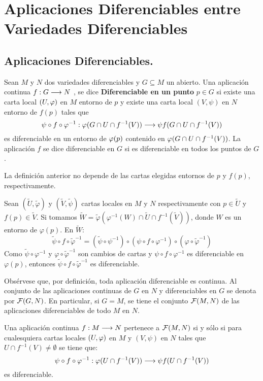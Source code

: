 \documentclass[cursovd_portada.tex]{subfiles}
\begin{document}
\chapter{Aplicaciones Diferenciables entre Variedades Diferenciables}
\section{Aplicaciones Diferenciables.}
\begin{defi}
Sean $M$ y $N$ dos variedades diferenciables y $G\subseteq M$ un abierto. Una aplicación continua $f:G\longrightarrow N$ , se
dice {\bf Diferenciable en un punto} $p\in G$ si existe una carta local $(U,\varphi)$ en $M$ entorno de $p$ y existe
una carta local $(V,\psi)$ en $N$ entorno de $f(p)$ tales que
$$\psi\circ f\circ\varphi^{-1}:\varphi(G\cap U\cap f^{-1}(V))\longrightarrow\psi f(G\cap U\cap f^{-1}(V))$$
es diferenciable en un entorno de $\varphi(p)$ contenido en $\varphi(G\cap U\cap f^{-1}(V))$. La aplicación $f$ se dice
diferenciable en $G$ si es diferenciable en todos los puntos de $G$.
\end{defi}
\begin{prop}
La definición anterior no depende de las cartas elegidas entornos de $p$ y $f(p)$, respectivamente.
\end{prop}
\begin{dem}
Sean $(\tilde{U},\tilde{φ})$ y $(\tilde{V},\tilde{ψ})$ cartas locales en $M$ y $N$ respectivamente con $p \in \tilde{U}$ y $f(p) \in \tilde{V}$. Si tomamos $\tilde{W} = \tilde{φ}(φ^{-1}(W) \cap \tilde{U} \cap f^{-1}(\tilde{V}))$, donde $W$ es un entorno de $φ(p)$. En $\tilde{W}$:
\[ \tilde{ψ} \circ f \circ \tilde{φ}^{-1} = (\tilde{ψ}\circ ψ^{-1}) \circ (ψ \circ f \circ φ^{-1}) \circ (φ \circ \tilde{φ}^{-1}) \]
Como $\tilde{ψ} \circ φ^{-1}$ y $φ \circ \tilde{φ}^{-1}$ son cambios de cartas y $ψ \circ f \circ φ^{-1}$ es diferenciable en $φ(p)$, entonces $\tilde{ψ} \circ f \circ \tilde{φ}^{-1}$ es diferenciable. \QED
\end{dem}
Obsérvese que, por definición, toda aplicación
diferenciable es continua. Al conjunto de las aplicaciones
continuas de $G$ en $N$ y diferenciables en $G$ se denota por
${\cal F}(G,N)$. En particular, si $G=M$, se tiene el conjunto
${\cal F}(M,N)$ de las aplicaciones diferenciables de todo $M$ en
$N$.
\begin{prop}
Una aplicación continua $f:M\longrightarrow N$ pertenece a ${\cal F}(M,N)$ si y sólo si para cualesquiera cartas locales
$(U,\varphi)$ en $M$ y $(V,\psi)$ en $N$ tales que $U\cap f^{-1}(V)\neq\emptyset$ se tiene que:
$$\psi\circ f\circ\varphi^{-1}:\varphi(U\cap f^{-1}(V))\longrightarrow\psi f(U\cap f^{-1}(V))$$
es diferenciable.
\end{prop}
\end{document}
